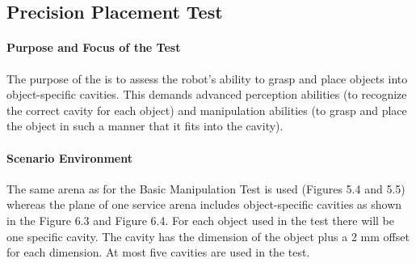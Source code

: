 \subsection{Precision Placement Test}

\paragraph{Purpose and Focus of the Test}
The purpose of the  is to assess the robot’s ability to grasp and place objects into object-specific cavities. This demands advanced perception abilities (to recognize the correct cavity for each object) and manipulation abilities (to grasp and place the object in such a manner that it fits into the cavity).

\paragraph{Scenario Environment}
The same arena as for the Basic Manipulation Test is used (Figures 5.4 and 5.5) whereas the plane of one service arena includes object-specific cavities as shown in the Figure 6.3 and Figure 6.4. For each object used in the test there will be one specific cavity. The cavity has the dimension of the object plus a 2 mm offset for each dimension. At most five cavities are used in the test.


